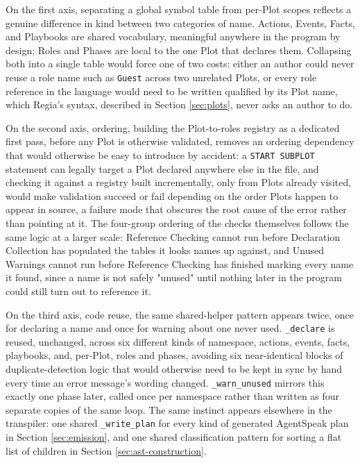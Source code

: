On the first axis, separating a global symbol table from per-Plot scopes reflects a genuine difference in kind between two categories of name. Actions, Events, Facts, and Playbooks are shared vocabulary, meaningful anywhere in the program by design; Roles and Phases are local to the one Plot that declares them. Collapsing both into a single table would force one of two costs: either an author could never reuse a role name such as \lstinline|Guest| across two unrelated Plots, or every role reference in the language would need to be written qualified by its Plot name, which Regia's syntax, described in Section \ref{sec:plots}, never asks an author to do.

On the second axis, ordering, building the Plot-to-roles registry as a dedicated first pass, before any Plot is otherwise validated, removes an ordering dependency that would otherwise be easy to introduce by accident: a \lstinline|START SUBPLOT| statement can legally target a Plot declared anywhere else in the file, and checking it against a registry built incrementally, only from Plots already visited, would make validation succeed or fail depending on the order Plots happen to appear in source, a failure mode that obscures the root cause of the error rather than pointing at it. The four-group ordering of the checks themselves follows the same logic at a larger scale: Reference Checking cannot run before Declaration Collection has populated the tables it looks names up against, and Unused Warnings cannot run before Reference Checking has finished marking every name it found, since a name is not safely "unused" until nothing later in the program could still turn out to reference it.

On the third axis, code reuse, the same shared-helper pattern appears twice, once for declaring a name and once for warning about one never used. \lstinline|_declare| is reused, unchanged, across six different kinds of namespace, actions, events, facts, playbooks, and, per-Plot, roles and phases, avoiding six near-identical blocks of duplicate-detection logic that would otherwise need to be kept in sync by hand every time an error message's wording changed. \lstinline|_warn_unused| mirrors this exactly one phase later, called once per namespace rather than written as four separate copies of the same loop. The same instinct appears elsewhere in the transpiler: one shared \lstinline|_write_plan| for every kind of generated AgentSpeak plan in Section \ref{sec:emission}, and one shared classification pattern for sorting a flat list of children in Section \ref{sec:ast-construction}.

